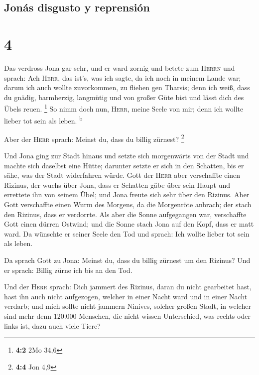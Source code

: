 \hypertarget{jonuxe1s-disgusto-y-reprensiuxf3n}{%
\subsection{Jonás disgusto y
reprensión}\label{jonuxe1s-disgusto-y-reprensiuxf3n}}

\hypertarget{section-3}{%
\section{4}\label{section-3}}

 Das verdross Jona gar sehr, und er ward zornig
 und betete zum \textsc{Herrn} und sprach: Ach
\textsc{Herr}, das ist's, was ich sagte, da ich noch in meinem Lande
war; darum ich auch wollte zuvorkommen, zu fliehen gen Tharsis; denn ich
weiß, dass du gnädig, barmherzig, langmütig und von großer Güte bist und
lässt dich des Übels reuen. \footnote{\textbf{4:2} 2Mo 34,6}
 So nimm doch nun, \textsc{Herr}, meine Seele von mir;
denn ich wollte lieber tot sein als leben. \textsuperscript{b}

 Aber der \textsc{Herr} sprach: Meinst du, dass du billig
zürnest? \footnote{\textbf{4:4} Jon 4,9}

 Und Jona ging zur Stadt hinaus und setzte sich
morgenwärts von der Stadt und machte sich daselbst eine Hütte; darunter
setzte er sich in den Schatten, bis er sähe, was der Stadt widerfahren
würde.  Gott der \textsc{Herr} aber verschaffte einen
Rizinus, der wuchs über Jona, dass er Schatten gäbe über sein Haupt und
errettete ihn von seinem Übel; und Jona freute sich sehr über den
Rizinus.  Aber Gott verschaffte einen Wurm des Morgens, da
die Morgenröte anbrach; der stach den Rizinus, dass er verdorrte.
 Als aber die Sonne aufgegangen war, verschaffte Gott
einen dürren Ostwind; und die Sonne stach Jona auf den Kopf, dass er
matt ward. Da wünschte er seiner Seele den Tod und sprach: Ich wollte
lieber tot sein als leben.

 Da sprach Gott zu Jona: Meinst du, dass du billig zürnest
um den Rizinus? Und er sprach: Billig zürne ich bis an den Tod.

 Und der \textsc{Herr} sprach: Dich jammert des Rizinus,
daran du nicht gearbeitet hast, hast ihn auch nicht aufgezogen, welcher
in einer Nacht ward und in einer Nacht verdarb;  und mich
sollte nicht jammern Ninives, solcher großen Stadt, in welcher sind mehr
denn 120.000 Menschen, die nicht wissen Unterschied, was rechts oder
links ist, dazu auch viele Tiere?
